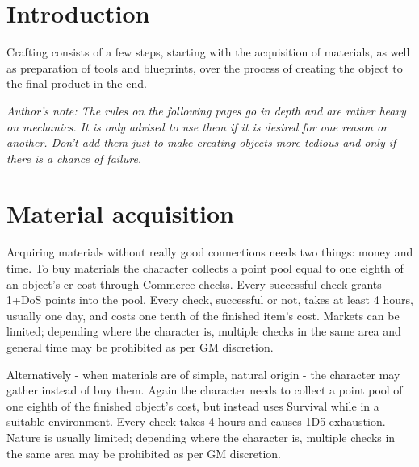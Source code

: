 \documentclass[12pt,a4paper,openany]{book}
\begin{document}
	

	\chapter{Introduction}
	Crafting consists of a few steps, starting with the acquisition of materials, as well as preparation of tools and blueprints, over the process of creating the object to the final product in the end.\par
	\vspace{5mm}
	\textit{Author's note: The rules on the following pages go in depth and are rather heavy on mechanics. It is only advised to use them if it is desired for one reason or another. Don't add them just to make creating objects more tedious and only if there is a chance of failure.}

	\chapter{Material acquisition}
	Acquiring materials without really good connections needs two things: money and time. To buy materials the character collects a point pool equal to one eighth of an object’s cr cost through Commerce checks. Every successful check grants 1+DoS points into the pool. Every check, successful or not, takes at least 4 hours, usually one day, and costs one tenth of the finished item’s cost. Markets can be limited; depending where the character is, multiple checks in the same area and general time may be prohibited as per GM discretion. \par
	Alternatively - when materials are of simple, natural origin - the character may gather instead of buy them. Again the character needs to collect a point pool of one eighth of the finished object's cost, but instead uses Survival while in a suitable environment. Every check takes 4 hours and causes 1D5 exhaustion. Nature is usually limited; depending where the character is, multiple checks in the same area may be prohibited as per GM discretion.
\end{document}
